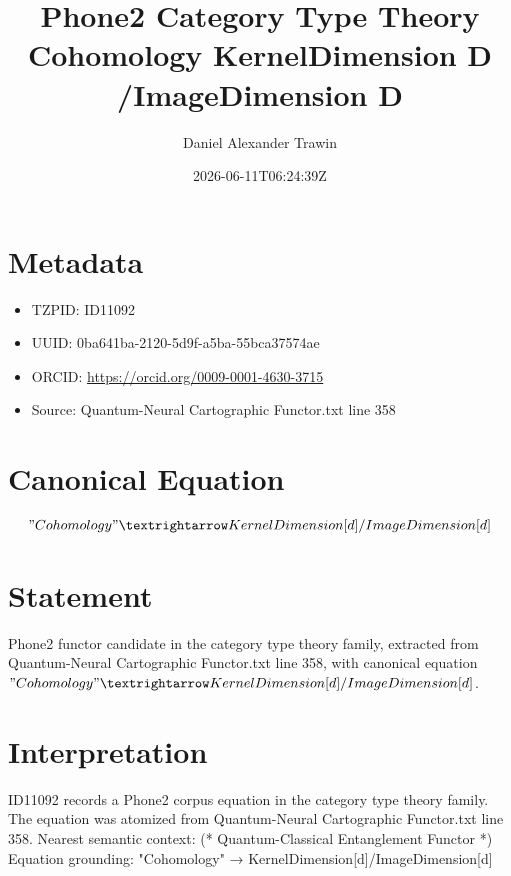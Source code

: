 \documentclass[11pt]{article}
\title{Phone2 Category Type Theory Cohomology KernelDimension D /ImageDimension D}
\author{Daniel Alexander Trawin}
\date{2026-06-11T06:24:39Z}
\begin{document}
\maketitle
\section*{Metadata}
\begin{itemize}
\item TZPID: ID11092
\item UUID: 0ba641ba-2120-5d9f-a5ba-55bca37574ae
\item ORCID: \url{https://orcid.org/0009-0001-4630-3715}
\item Source: Quantum-Neural Cartographic Functor.txt line 358
\end{itemize}
\section*{Canonical Equation}
\[
"Cohomology" → KernelDimension[d]/ImageDimension[d]
\]
\section*{Statement}
Phone2 functor candidate in the category type theory family, extracted from Quantum-Neural Cartographic Functor.txt line 358, with canonical equation $"Cohomology" → KernelDimension[d]/ImageDimension[d]$.
\section*{Interpretation}
ID11092 records a Phone2 corpus equation in the category type theory family. The equation was atomized from Quantum-Neural Cartographic Functor.txt line 358. Nearest semantic context: (* Quantum-Classical Entanglement Functor *) Equation grounding: "Cohomology" → KernelDimension[d]/ImageDimension[d]
\end{document}
